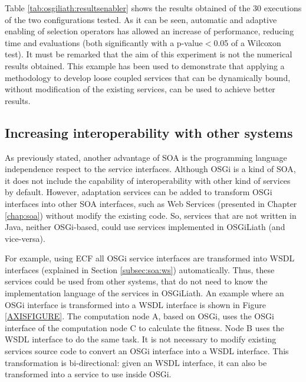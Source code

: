 Table \ref{tab:osgiliath:resultsenabler} shows the results obtained of the 30 executions of the two configurations tested. As it can be seen, automatic and adaptive enabling of selection operators has allowed an increase of performance, reducing time and evaluations (both significantly with a p-value$<$0.05 of a Wilcoxon test). It must be remarked that the aim of this experiment is not the numerical results obtained. This example has been used to demonstrate that applying a methodology to develop loose coupled services that can be dynamically bound, without modification of the existing services, can be used to achieve better results.


\subsection{Increasing interoperability with other systems}

As previously stated, another advantage of SOA is the programming
language independence respect to the service interfaces. Although OSGi
is a kind of SOA, it does not include  the capability of
interoperability with other kind of services by default. However,
adaptation services can be added to transform OSGi interfaces into
other SOA interfaces, such as Web Services (presented in Chapter
\ref{chap:soa}) without modify the existing code. So, services that are not written in Java, neither
OSGi-based, could use services implemented in OSGiLiath (and
vice-versa). 



For example, using ECF all OSGi service interfaces are
transformed into WSDL  interfaces (explained in Section \ref{subsec:soa:ws}) automatically. %
Thus, these services could be used from other systems, that do not
need to know the implementation language of the services in
OSGiLiath. An example where an OSGi interface is transformed into a
WSDL interface is shown in Figure \ref{AXISFIGURE}. %
The computation
node A, based on OSGi, uses the OSGi interface of the computation node
C to calculate the fitness. Node B uses the WSDL interface to do the
same task. It is not necessary to modify existing services source code
to convert an OSGi interface into a WSDL interface. This
transformation is bi-directional: given an WSDL interface, it can also
be transformed into a service to use inside OSGi. %

